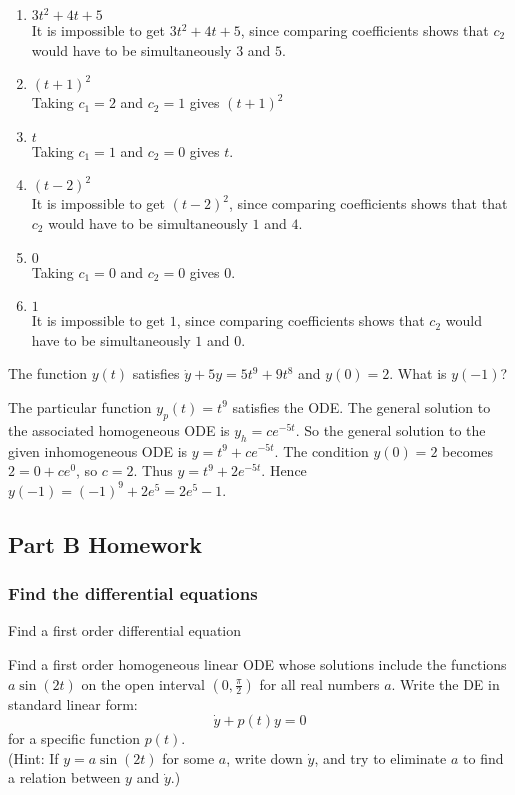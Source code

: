 \begin{enumerate}
\item $3t^2+4t+5$ \\
  It is impossible to get $3t^2+4t+5$, since comparing coefficients shows that
  $c_2$ would have to be simultaneously $3$ and $5$.
\item $(t+1)^2$ \\
  Taking $c_1 = 2$ and $c_2 = 1$ gives $(t+1)^2$ 
\item $t$ \\
  Taking $c_1 = 1$ and $c_2 = 0$ gives $t$.
\item $(t-2)^2 $ \\
  It is impossible to get $(t-2)^2 $, since comparing coefficients shows that
  that $c_2$ would have to be simultaneously $1$ and $4$.
\item $0$ \\
  Taking $c_1 = 0$ and $c_2 = 0$ gives $0$.
\item $1$ \\
  It is impossible to get $1$, since comparing coefficients shows that $c_2$ would have
  to be simultaneously $1$ and $0$.
\end{enumerate}

\begin{homework}
  The function $y(t)$ satisfies $\dot{y} + 5 y = 5 t^9 + 9 t^8$ and $y(0)=2$. What is $y(−1)$? 
\end{homework}

The particular function $y_ p(t) = t^9$ satisfies the ODE.
The general solution to the associated homogeneous ODE is $y_ h = c e^{-5t}$.
So the general solution to the given inhomogeneous ODE is $y = t^9 + c e^{-5t}$.
The condition $y(0) = 2$ becomes $2 = 0 + c e ^0$, so $c = 2$.
Thus $y = t^9 + 2 e ^{−5t}$. Hence $y(−1) = (−1) ^9 + 2 e ^5 = 2 e ^5 - 1$.
\clearpage

\subsection{Part B Homework}
\subsubsection{Find the differential equations}

\begin{homework}
  Find a first order differential equation
\end{homework}
Find a first order homogeneous linear ODE whose solutions include the functions
$a \sin⁡ (2t)$ on the open interval $( 0, \frac{\pi}{2})$ for all real numbers $a$.
Write the DE in standard linear form:
\begin{equation*}
  \dot{y} + p(t) y = 0
\end{equation*}
for a specific function $p(t)$.\\
(Hint: If $y = a\sin ⁡(2t)$ for some $a$,
write down $\dot{y}$, and try to eliminate $a$ to find a relation between $y$ and $\dot y$.)\\

